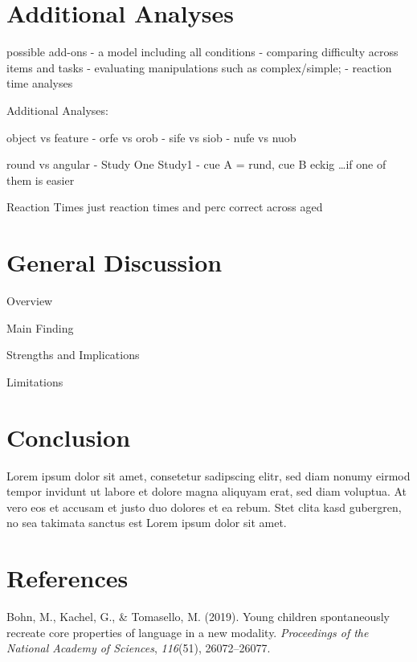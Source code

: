 \documentclass[
  man]{apa6}
\newlength{\cslhangindent}
\newenvironment{CSLReferences}[2] %
 {\begin{list}{}{%
  \setlength{\itemindent}{0pt}
  \setlength{\leftmargin}{0pt}
  \setlength{\parsep}{0pt}
  \ifodd #1
   \setlength{\leftmargin}{\cslhangindent}
   \setlength{\itemindent}{-1\cslhangindent}
  \fi
  \setlength{\itemsep}{#2\baselineskip}}}
 {\end{list}}
\begin{document}
\section{Additional Analyses}\label{additional-analyses}

possible add-ons
- a model including all conditions
- comparing difficulty across items and tasks
- evaluating manipulations such as complex/simple;
- reaction time analyses

Additional Analyses:

object vs feature
- orfe vs orob
- sife vs siob
- nufe vs nuob

round vs angular
- Study One Study1 - cue A = rund, cue B eckig \ldots if one of them is easier

Reaction Times
just reaction times and perc correct across aged

\section{General Discussion}\label{general-discussion}

Overview

Main Finding

Strengths and Implications

Limitations

\section{Conclusion}\label{conclusion}

Lorem ipsum dolor sit amet, consetetur sadipscing elitr, sed diam nonumy eirmod tempor invidunt ut labore et dolore magna aliquyam erat, sed diam voluptua. At vero eos et accusam et justo duo dolores et ea rebum. Stet clita kasd gubergren, no sea takimata sanctus est Lorem ipsum dolor sit amet.

\newpage

\section{References}\label{references}

\label{refs}
\begin{CSLReferences}{1}{0}
Bohn, M., Kachel, G., \& Tomasello, M. (2019). Young children spontaneously recreate core properties of language in a new modality. \emph{Proceedings of the National Academy of Sciences}, \emph{116}(51), 26072--26077.

\end{CSLReferences}
\end{document}
